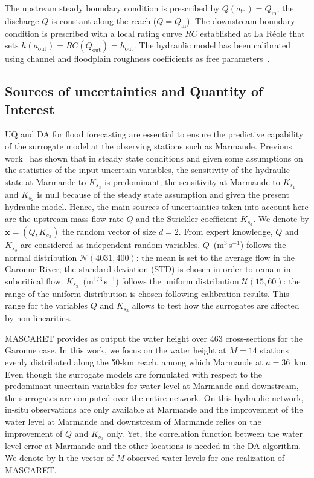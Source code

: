 The upstream steady boundary condition is prescribed by $Q(a_{\text{in}}) = Q_{\text{in}}$; the discharge $Q$ is constant along the reach ($Q = Q_{\text{in}}$). The downstream boundary condition is prescribed with a local rating curve $RC$ established at La R\'eole that sets $h(a_{\text{out}}) = RC(Q_{\text{out}}) = h_{\text{out}}$. The hydraulic model has been calibrated using channel and floodplain roughness coefficients as free parameters~\citep{besnard2011}. 

\subsection{Sources of uncertainties and Quantity of Interest}\label{sec:database}

UQ and DA for flood forecasting are essential to ensure the predictive capability of the surrogate model at the observing stations such as Marmande. Previous work~\citep{elmocaydEMA} has shown that in steady state conditions and given some assumptions on the statistics of the input uncertain variables, the sensitivity of the hydraulic state at Marmande to $K_{s_3}$ is predominant; the sensitivity at Marmande to $K_{s_1}$ and $K_{s_2}$ is null because of the steady state assumption and given the present hydraulic model. Hence, the main sources of uncertainties taken into account here are the upstream mass flow rate $Q$ and the Strickler coefficient $K_{s_3}$. We denote by $\mathbf{x} = (Q, K_{s_3})$ the random vector of size $d = 2$. From expert knowledge, $Q$ and $K_{s_3}$ are considered as independent random variables. $Q$~(m$^3$\,s$^{-1}$) follows the normal distribution $\mathcal{N}(4031,400)$: the mean is set to the average flow in the Garonne River; the standard deviation (STD) is chosen in order to remain in subcritical flow. $K_{s_3}$~(m$^{1/3}$\,s$^{-1}$) follows the uniform distribution $\mathcal{U}(15,60)$: the range of the uniform distribution is chosen following calibration results. This range for the variables $Q$ and $K_{s_3}$ allows to test how the surrogates are affected by non-linearities. 

MASCARET provides as output the water height over 463 cross-sections for the Garonne case. In this work, we focus on the water height at $M = 14$ stations evenly distributed along the 50-km reach, among which Marmande at $a = 36$~km. Even though the surrogate models are formulated with respect to the predominant uncertain variables for water level at Marmande and downstream, the surrogates are computed over the entire network. On this hydraulic network, in-situ observations are only available at Marmande and the improvement of the water level at Marmande and downstream of Marmande
relies on the improvement of $Q$ and $K_{s_3}$ only. Yet, the correlation function between the water level error at Marmande and the other locations is needed in the DA algorithm. We denote by $\mathbf{h}$ the vector of $M$ observed water levels for one realization of MASCARET.

